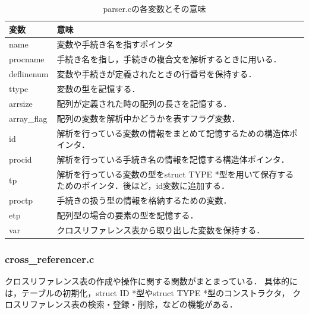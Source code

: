 \documentclass{jlreq}
\begin{document}
\begin{table}[H]
  \centering
  \caption{parser.cの各変数とその意味}
  \begin{tabular}{|l|p{10cm}|}
    \hline
    変数        & 意味                                                                                                \\ \hline
    name        & 変数や手続き名を指すポインタ                                                                        \\
    procname    & 手続き名を指し，手続きの複合文を解析するときに用いる．                                              \\
    deflinenum  & 変数や手続きが定義されたときの行番号を保持する．                                                    \\
    ttype       & 変数の型を記憶する．                                                                                \\
    arrsize     & 配列が定義された時の配列の長さを記憶する．                                                          \\
    array\_flag & 配列の変数を解析中かどうかを表すフラグ変数．                                                        \\
    id          & 解析を行っている変数の情報をまとめて記憶するための構造体ポインタ．                                  \\
    procid      & 解析を行っている手続き名の情報を記憶する構造体ポインタ．                                            \\
    tp          & 解析を行っている変数の型をstruct TYPE *型を用いて保存するためのポインタ．後ほど，id変数に追加する． \\
    proctp      & 手続きの扱う型の情報を格納するための変数．                                                          \\
    etp         & 配列型の場合の要素の型を記憶する．                                                                  \\
    var         & クロスリファレンス表から取り出した変数を保持する．                                                  \\ \hline
  \end{tabular}
  \label{tab:parser_design}
\end{table}

\subsubsection{cross\_referencer.c}
クロスリファレンス表の作成や操作に関する関数がまとまっている．
具体的には，テーブルの初期化，struct ID *型やstruct TYPE *型のコンストラクタ，
クロスリファレンス表の検索・登録・削除，などの機能がある．
\end{document}
